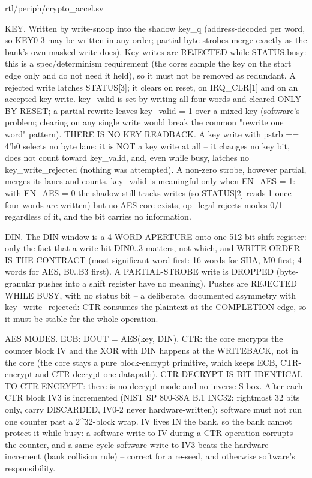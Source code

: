 \begin{relocated}{rtl/periph/crypto_accel.sv}
\begin{textblock}
KEY. Written by write-snoop into the shadow key_q (address-decoded per word, so KEY0-3 may be
written in any order; partial byte strobes merge exactly as the bank's own masked write does).
Key writes are REJECTED while STATUS.busy: this is a spec/determinism requirement (the cores
sample the key on the start edge only and do not need it held), so it must not be removed as
redundant. A rejected write latches STATUS[3]; it clears on reset, on IRQ_CLR[1] and on an
accepted key write. key_valid is set by writing all four words and cleared ONLY BY RESET; a
partial rewrite leaves key_valid = 1 over a mixed key (software's problem; clearing on any
single write would break the common "rewrite one word" pattern). THERE IS NO KEY READBACK.
A key write with pstrb == 4'h0 selects no byte lane: it is NOT a key write at all -- it changes
no key bit, does not count toward key_valid, and, even while busy, latches no key_write_rejected
(nothing was attempted). A non-zero strobe, however partial, merges its lanes and counts.
key_valid is meaningful only when EN_AES = 1: with EN_AES = 0 the shadow still tracks writes (so
STATUS[2] reads 1 once four words are written) but no AES core exists, op_legal rejects modes
0/1 regardless of it, and the bit carries no information.

DIN. The DIN window is a 4-WORD APERTURE onto one 512-bit shift register: only the fact that a
write hit DIN0..3 matters, not which, and WRITE ORDER IS THE CONTRACT (most significant word
first: 16 words for SHA, M0 first; 4 words for AES, B0..B3 first). A PARTIAL-STROBE write is
DROPPED (byte-granular pushes into a shift register have no meaning). Pushes are REJECTED WHILE
BUSY, with no status bit -- a deliberate, documented asymmetry with key_write_rejected: CTR
consumes the plaintext at the COMPLETION edge, so it must be stable for the whole operation.

AES MODES. ECB: DOUT = AES(key, DIN). CTR: the core encrypts the counter block IV and the XOR
with DIN happens at the WRITEBACK, not in the core (the core stays a pure block-encrypt
primitive, which keeps ECB, CTR-encrypt and CTR-decrypt one datapath). CTR DECRYPT IS
BIT-IDENTICAL TO CTR ENCRYPT: there is no decrypt mode and no inverse S-box. After each CTR block
IV3 is incremented (NIST SP 800-38A B.1 INC32: rightmost 32 bits only, carry DISCARDED, IV0-2
never hardware-written); software must not run one counter past a 2^32-block wrap. IV lives IN
the bank, so the bank cannot protect it while busy: a software write to IV during a CTR
operation corrupts the counter, and a same-cycle software write to IV3 beats the hardware
increment (bank collision rule) -- correct for a re-seed, and otherwise software's responsibility.


\end{textblock}
\end{relocated}
